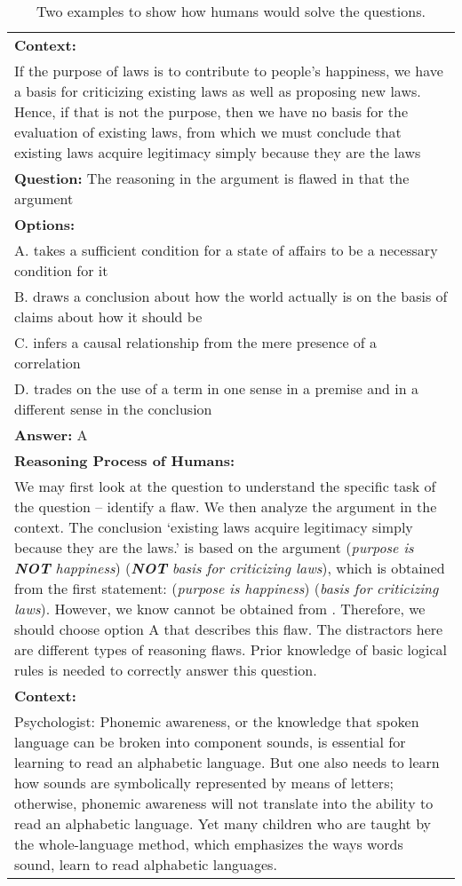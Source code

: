 \documentclass{article} \usepackage{iclr2020_conference,times}
\begin{document}
\begin{table}
    \small
	\centering
	\caption{Two examples to show how humans would solve the questions.}
	\begin{tabular}{|p{\columnwidth}|}
		\hline 
        \textbf{Context:}\\
        If the purpose of laws is to contribute to people's happiness, we have a basis for criticizing existing laws as well as proposing new laws. Hence, if that is not the purpose, then we have no basis for the evaluation of existing laws, from which we must conclude that existing laws acquire legitimacy simply because they are the laws\\
        \textbf{Question:} The reasoning in the argument is flawed in that the argument\\
        \textbf{Options:} \\
        A. takes a sufficient condition for a state of affairs to be a necessary condition for it\\
        B. draws a conclusion about how the world actually is on the basis of claims about how it should be\\
        C. infers a causal relationship from the mere presence of a correlation\\
        D. trades on the use of a term in one sense in a premise and in a different sense in the conclusion\\
        \textbf{Answer: } A\\
        \textbf{Reasoning Process of Humans: }\\
        We may first look at the question to understand the specific task of the question -- identify a flaw. We then analyze the argument in the context. The conclusion `existing laws acquire legitimacy simply because they are the laws.' is based on the argument (\textit{purpose is \textbf{NOT} happiness})  (\textit{\textbf{NOT} basis for criticizing laws}), which is obtained from the first statement: (\textit{purpose is happiness})  (\textit{basis for criticizing laws}). However, we know  cannot be obtained from . Therefore, we should choose option A that describes this flaw. The distractors here are different types of reasoning flaws. Prior knowledge of basic logical rules is needed to correctly answer this question.
        \\
		\hline
        \textbf{Context: }\\
        Psychologist: Phonemic awareness, or the knowledge that spoken language can be broken into component sounds, is essential for learning to read an alphabetic language. But one also needs to learn how sounds are symbolically represented by means of letters; otherwise, phonemic awareness will not translate into the ability to read an alphabetic language. Yet many children who are taught by the whole-language method, which emphasizes the ways words sound, learn to read alphabetic languages.\\

\end{tabular}
\end{table}
\end{document}
